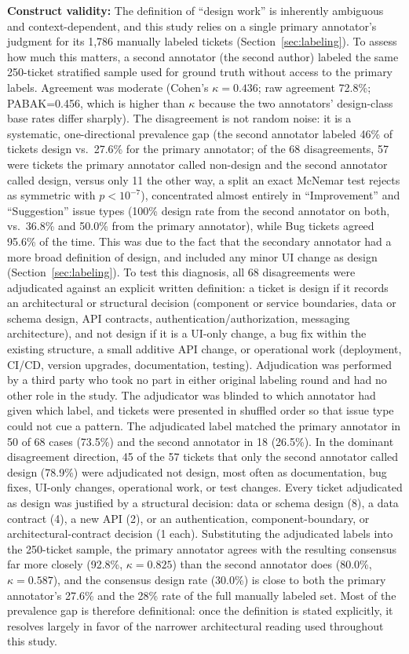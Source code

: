 \documentclass[preprint,12pt]{elsarticle}
\begin{document}
\textbf{Construct validity:} The definition of ``design work'' is inherently ambiguous and context-dependent, and this study relies on a single primary annotator's judgment for its 1,786 manually labeled tickets (Section~\ref{sec:labeling}). To assess how much this matters, a second annotator (the second author) labeled the same 250-ticket stratified sample used for ground truth without access to the primary labels. Agreement was moderate (Cohen's $\kappa=0.436$; raw agreement 72.8\%; PABAK=0.456, which is higher than $\kappa$ because the two annotators' design-class base rates differ sharply). The disagreement is not random noise: it is a systematic, one-directional prevalence gap (the second annotator labeled 46\% of tickets design vs.\ 27.6\% for the primary annotator; of the 68 disagreements, 57 were tickets the primary annotator called non-design and the second annotator called design, versus only 11 the other way, a split an exact McNemar test rejects as symmetric with $p<10^{-7}$), concentrated almost entirely in ``Improvement'' and ``Suggestion'' issue types (100\% design rate from the second annotator on both, vs.\ 36.8\% and 50.0\% from the primary annotator), while Bug tickets agreed 95.6\% of the time. This was due to the fact that the secondary annotator had a more broad definition of design, and included any minor UI change as design (Section~\ref{sec:labeling}). To test this diagnosis, all 68 disagreements were adjudicated against an explicit written definition: a ticket is design if it records an architectural or structural decision (component or service boundaries, data or schema design, API contracts, authentication/authorization, messaging architecture), and not design if it is a UI-only change, a bug fix within the existing structure, a small additive API change, or operational work (deployment, CI/CD, version upgrades, documentation, testing). Adjudication was performed by a third party who took no part in either original labeling round and had no other role in the study. The adjudicator was blinded to which annotator had given which label, and tickets were presented in shuffled order so that issue type could not cue a pattern. The adjudicated label matched the primary annotator in 50 of 68 cases (73.5\%) and the second annotator in 18 (26.5\%). In the dominant disagreement direction, 45 of the 57 tickets that only the second annotator called design (78.9\%) were adjudicated not design, most often as documentation, bug fixes, UI-only changes, operational work, or test changes. Every ticket adjudicated as design was justified by a structural decision: data or schema design (8), a data contract (4), a new API (2), or an authentication, component-boundary, or architectural-contract decision (1 each). Substituting the adjudicated labels into the 250-ticket sample, the primary annotator agrees with the resulting consensus far more closely (92.8\%, $\kappa=0.825$) than the second annotator does (80.0\%, $\kappa=0.587$), and the consensus design rate (30.0\%) is close to both the primary annotator's 27.6\% and the 28\% rate of the full manually labeled set. Most of the prevalence gap is therefore definitional: once the definition is stated explicitly, it resolves largely in favor of the narrower architectural reading used throughout this study.
\end{document}

